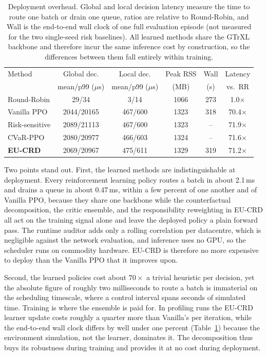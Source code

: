 \documentclass{article} %
\begin{document}
\begin{table}[t]
\caption{Deployment overhead. Global and local decision latency measure the time to route one batch or drain one queue, ratios are relative to Round-Robin, and Wall is the end-to-end wall clock of one full evaluation episode (not measured for the two single-seed risk baselines). All learned methods share the GTrXL backbone and therefore incur the same inference cost by construction, so the differences between them fall entirely within training.}
\label{tab:overhead}
\centering
\small
\begin{tabular*}{\linewidth}{@{\extracolsep{\fill}}lccccc@{}}
\toprule
Method & Global dec. & Local dec. & Peak RSS & Wall & Latency \\
       & mean/p99 ($\mu$s) & mean/p99 ($\mu$s) & (MB) & (s) & vs.\ RR \\
\midrule
Round-Robin      & 29/34      & 3/14    & 1066 & 273 & 1.0$\times$ \\
Vanilla PPO      & 2044/20165 & 467/600 & 1323 & 318 & 70.4$\times$ \\
Risk-sensitive   & 2089/21113 & 467/600 & 1323 & --  & 71.9$\times$ \\
CVaR-PPO         & 2080/20977 & 466/603 & 1324 & --  & 71.6$\times$ \\
\textbf{EU-CRD}  & 2069/20967 & 475/611 & 1329 & 319 & 71.2$\times$ \\
\bottomrule
\end{tabular*}
\end{table}

Two points stand out. First, the learned methods are indistinguishable at deployment. Every reinforcement learning policy routes a batch in about 2.1\,ms and drains a queue in about 0.47\,ms, within a few percent of one another and of Vanilla PPO, because they share one backbone while the counterfactual decomposition, the critic ensemble, and the responsibility reweighting in EU-CRD all act on the training signal alone and leave the deployed policy a plain forward pass. The runtime auditor adds only a rolling correlation per datacentre, which is negligible against the network evaluation, and inference uses no GPU, so the scheduler runs on commodity hardware. EU-CRD is therefore no more expensive to deploy than the Vanilla PPO that it improves upon.

Second, the learned policies cost about $70\times$ a trivial heuristic per decision, yet the absolute figure of roughly two milliseconds to route a batch is immaterial on the scheduling timescale, where a control interval spans seconds of simulated time. Training is where the ensemble is paid for. In profiling runs the EU-CRD learner update costs roughly a quarter more than Vanilla's per iteration, while the end-to-end wall clock differs by well under one percent (Table~\ref{tab:overhead}) because the environment simulation, not the learner, dominates it. The decomposition thus buys its robustness during training and provides it at no cost during deployment.
\end{document}
